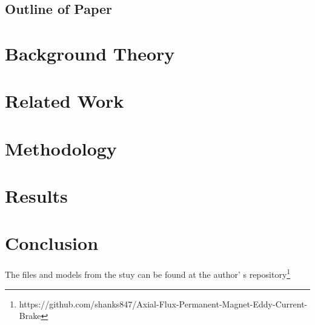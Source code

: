 \documentclass[lettersize,journal]{IEEEtran}
\begin{document}
\subsection{Outline of Paper}

\section{Background Theory}
\section{Related Work}
\section{Methodology}
\section{Results}
\section{Conclusion}
The files and models from the stuy can be found at the author' s repository\footnote[1]{https://github.com/shanks847/Axial-Flux-Permanent-Magnet-Eddy-Current-Brake}


\end{document}
